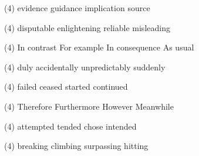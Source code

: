 \item
\begin{tasks}(4)
	\task evidence
	\task guidance
	\task implication
	\task source
\end{tasks}
\item
\begin{tasks}(4)
	\task disputable
	\task enlightening
	\task reliable
	\task misleading
\end{tasks}
\item
\begin{tasks}(4)
	\task In contrast
	\task For example
	\task In consequence
	\task As usual
\end{tasks}
\item
\begin{tasks}(4)
	\task duly
	\task accidentally
	\task unpredictably
	\task suddenly
\end{tasks}
\item
\begin{tasks}(4)
	\task failed
	\task ceased
	\task started
	\task continued
\end{tasks}
\item
\begin{tasks}(4)
	\task Therefore
	\task Furthermore
	\task However
	\task Meanwhile
\end{tasks}
\item
\begin{tasks}(4)
	\task attempted
	\task tended
	\task chose
	\task intended
\end{tasks}
\item
\begin{tasks}(4)
	\task breaking
	\task climbing
	\task surpassing
	\task hitting
\end{tasks}